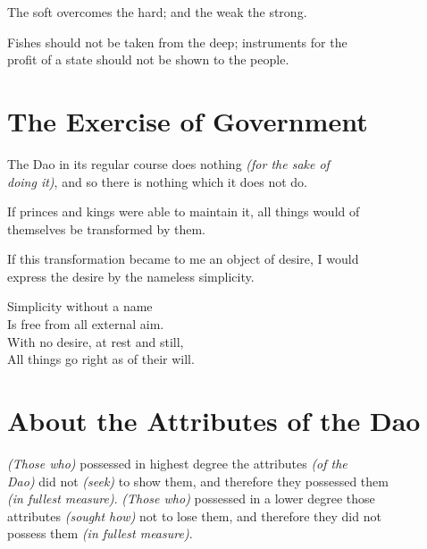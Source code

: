     The soft overcomes the hard; and the weak the strong.\vspace{\baselineskip}
    
    Fishes should not be taken from the deep; instruments for the\\
    profit of a state should not be shown to the people.\vspace{\baselineskip}
    
\section*{The Exercise of Government}
    The Dao in its regular course does nothing \textit{(for the sake of\\
    doing it)}, and so there is nothing which it does not do.\vspace{\baselineskip}
    
    If princes and kings were able to maintain it, all things would of\\
    themselves be transformed by them.\vspace{\baselineskip}
    
    If this transformation became to me an object of desire, I would\\
    express the desire by the nameless simplicity.\vspace{\baselineskip}
    
    Simplicity without a name\\
    Is free from all external aim.\\
    With no desire, at rest and still,\\
    All things go right as of their will.\vspace{\baselineskip}
\newpage{}

\section*{About the Attributes of the Dao}
    \textit{(Those who)} possessed in highest degree the attributes \textit{(of the\\
    Dao)} did not \textit{(seek)} to show them, and therefore they possessed them\\
    \textit{(in fullest measure)}. \textit{(Those who)} possessed in a lower degree those\\
    attributes \textit{(sought how)} not to lose them, and therefore they did not\\
    possess them \textit{(in fullest measure)}.\vspace{\baselineskip}
    
